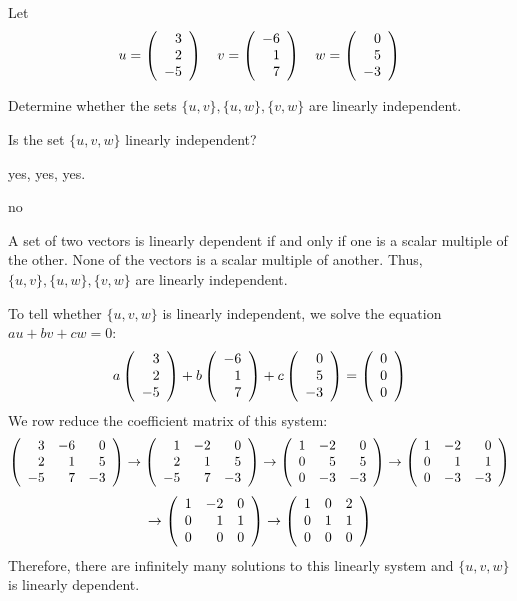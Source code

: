 \documentclass{ximera}
\author{Marty Golubitsky}
\begin{document}
\begin{exercise}\label{C5.4.10}
 Let 
 \[
 u = \left(\begin{array}{rrrrrrrrrrrrrrrrrr} 3\\2\\-5 \end{array}\right) \quad v = \left(\begin{array}{rrrrrrrrrrrrrrrrrr} -6\\1\\7 \end{array}\right) \quad w = \left(\begin{array}{rrrrrrrrrrrrrrrrrr} 0\\5\\-3 \end{array}\right)
 \]
\begin{enumeratea}
\item Determine whether the sets $\{u,v\}, \{u,w\}, \{v,w\}$ are linearly independent.
\item Is the set $\{u,v,w\}$ linearly independent? 
\end{enumeratea}

  
\begin{solution}

\ans %
\begin{enumeratea}
\item yes, yes, yes.
\item no
\end{enumeratea}

\soln %

\begin{enumeratea}
\item A set of two vectors is linearly dependent if and only if one is a scalar multiple of the other.  None of the vectors is a scalar multiple of another. Thus, $\{u,v\}, \{u,w\}, \{v,w\}$ are linearly independent.
\item To tell whether $\{u,v,w\}$ is linearly independent, we solve the equation $au + bv + cw = 0$:
\[ 
a \left(\begin{array}{rrrrrrrrrrrrrrrrrr} 3 \\ 2 \\ -5 \end{array}\right) + b\left(\begin{array}{rrrrrrrrrrrrrrrrrr} -6\\1\\7 \end{array}\right) + c\left(\begin{array}{rrrrrrrrrrrrrrrrrr} 0\\5\\-3 \end{array}\right) = \left(\begin{array}{rrrrrrrrrrrrrrrrrr} 0\\0\\0 \end{array}\right)
\]
We row reduce the coefficient matrix of this system: 
\[ 
\left(\begin{array}{rrrrrrrrrrrrrrrrrr}  3 & -6 & 0 \\ 2 & 1 & 5 \\ -5 & 7 & -3  \end{array}\right) \to \left(\begin{array}{rrrrrrrrrrrrrrrrrr}  1 & -2 & 0 \\ 2 & 1 & 5 \\ -5 & 7 & -3  \end{array}\right)  \to \left(\begin{array}{rrrrrrrrrrrrrrrrrr}  1 & -2 & 0 \\ 0 & 5 & 5 \\ 0 & -3 & -3  \end{array}\right) \to\left(\begin{array}{rrrrrrrrrrrrrrrrrr}  1 & -2 & 0 \\ 0 & 1 & 1 \\ 0 & -3 & -3  \end{array}\right) \] \[ \to \left(\begin{array}{rrrrrrrrrrrrrrrrrr}  1 & -2 & 0 \\ 0 & 1 & 1 \\ 0 & 0 & 0  \end{array}\right) \to  \left(\begin{array}{rrrrrrrrrrrrrrrrrr}  1 & 0 & 2 \\ 0 & 1 & 1 \\ 0 & 0 & 0  \end{array}\right) 
\]
Therefore, there are infinitely many solutions to this linearly system and $\{u,v,w\}$ is linearly dependent.


\end{enumeratea}
\end{solution}
\end{exercise}
\end{document}
